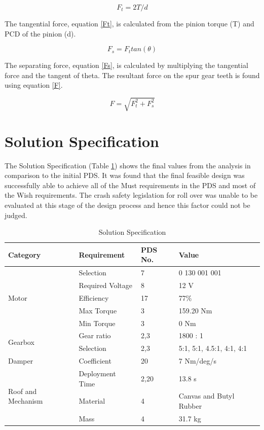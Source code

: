 \documentclass[a4paper]{article}
\begin{document}
\begin{equation}
    F_{t}=2 T/d
    \label{Ft}
\end{equation}

The tangential force, equation \ref{Ft}, is calculated from the pinion torque (T) and PCD of the pinion (d). 

\begin{equation}
    F_{s}=F_{t} tan(\theta)
    \label{Fs}
\end{equation}

The separating force, equation \ref{Fs}, is calculated by multiplying the tangential force and the tangent of theta. The resultant force on the spur gear teeth is found using  equation \ref{F}.

\begin{equation}
    F = \sqrt{F_t^2 + F_s^2}
    \label{F}
\end{equation}

\section{Solution Specification}

The Solution Specification (Table \ref{SolSpec}) shows the final values from the analysis in comparison to the initial PDS. It was found that the final feasible design was successfully able to achieve all of the Must requirements in the PDS and most of the Wish requirements. The crash safety legislation for roll over was unable to be evaluated at this stage of the design process and hence this factor could not be judged.

\begin{table}[H]
\centering
\caption{Solution Specification}
\label{SolSpec}
\begin{tabular}{||l|l|l|l||}
\hline
Category & Requirement & PDS No. & Value \\
\hline\hline
\multirow{5}{*}{Motor} & Selection & 7 & 0 130 001 001 \\ \cline{2-4} 
 & Required Voltage & 8 & 12 V \\ \cline{2-4} 
 & Efficiency & 17 & 77\% \\ \cline{2-4} 
 & Max Torque & 3 & 159.20 Nm \\ \cline{2-4} 
 & Min Torque & 3 & 0 Nm \\ \hline
\multirow{2}{*}{Gearbox} & Gear ratio & 2,3 & 1800 : 1 \\ \cline{2-4} 
 & Selection & 2,3 & 5:1, 5:1, 4.5:1, 4:1, 4:1 \\ \hline
Damper & Coefficient & 20 & 7 Nm/deg/s \\ \hline
\multirow{3}{*}{Roof and Mechanism} & Deployment Time & 2,20 & 13.8 s \\ \cline{2-4} 
 & Material & 4 & Canvas and Butyl Rubber \\ \cline{2-4} 
 & Mass & 4 & 31.7 kg \\ \hline\hline
\end{tabular}
\end{table}
\end{document}
